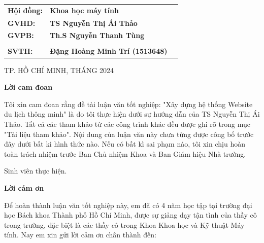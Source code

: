 \documentclass[12pt,a4paper]{report}
\begin{document}
\begin{titlepage}
\begin{center}
\begin{tabular}{lll}
    \end{tabular}
\end{center}
\vspace{1cm}
\begin{table}[h!]
    \fontsize{15pt}{1}
    \centering
    \begin{tabular}{lll}
        \textbf{Hội đồng:} & \textbf{Khoa học máy tính}\\
        \textbf{GVHD:} & \textbf{TS Nguyễn Thị Ái Thảo }\\
        \textbf{GVPB:} & \textbf{Th.S Nguyễn Thanh Tùng}\\
\\
        \textbf{SVTH:} & \textbf{Đặng Hoàng Minh Trí (1513648)}\\
    \end{tabular}
\end{table}
\vspace{2.5cm}
\begin{center}
{\footnotesize TP. HỒ CHÍ MINH, THÁNG 2024}
\end{center}
\end{titlepage}

\pagestyle{empty}
\begin{center}
\textbf{\LARGE Lời cam đoan}
\end{center}

Tôi xin cam đoan rằng đề tài luận văn tốt nghiệp: "Xây dựng hệ thống Website du lịch thông minh" là do tôi thực hiện dưới sự hướng dẫn của TS Nguyễn Thị Ái Thảo. Tất cả các tham khảo từ các công trình khác đều được ghi rõ trong mục "Tài liệu tham khảo". Nội dung của luận văn này chưa từng được công bố trước đây dưới bất kì hình thức nào. Nếu có bất kì sai phạm nào, tôi xin chịu hoàn toàn trách nhiệm trước Ban Chủ nhiệm Khoa và
Ban Giám hiệu Nhà trường.

\begin{flushright}
	Sinh viên thực hiện.
\end{flushright}
\newpage
\begin{center}
	\textbf{\LARGE Lời cảm ơn}
\end{center}

Để hoàn thành luận văn tốt nghiệp này, em đã có 4 năm học tập tại trường đại học Bách khoa Thành phố Hồ Chí Minh, được sự giảng dạy tận tình của thầy cô trong trường, đặc biệt là các thầy cô trong Khoa Khoa học và Kỹ thuật Máy tính. Nay em xin gửi lời cảm ơn chân thành đến:
\end{document}
